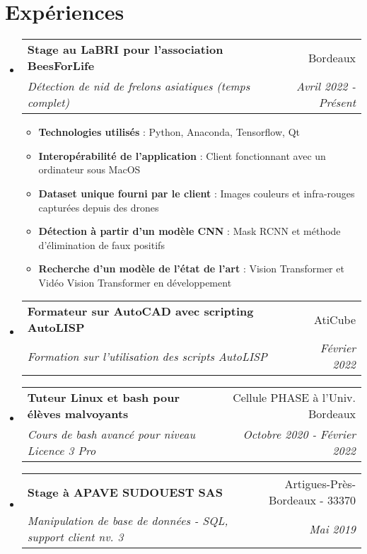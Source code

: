 \documentclass[a4paper]{article}
\makeatletter
\newcommand{\cvitem}[2]{
	\item{
		\textbf{#1}{ : #2 } 
	}
}
\newcommand{\cvsubheading}[4]{
  \vspace{-1pt}\item
    \begin{tabular*}{0.97\textwidth}{l@{\extracolsep{\fill}}r}
      \textbf{#1} & #2 \\
      \textit{#3} & \textit{#4} \\
    \end{tabular*}
}
\makeatother
\begin{document}
\section{Expériences}
	\begin{itemize}[leftmargin=*]
		\cvsubheading{Stage au LaBRI pour l'association BeesForLife}{Bordeaux}
{Détection de nid de frelons asiatiques (temps complet)}{Avril 2022 - Présent}
		\begin{itemize}
			\cvitem{Technologies utilisés}{Python, Anaconda, Tensorflow, Qt}
			\cvitem{Interopérabilité de l'application}{Client fonctionnant avec un ordinateur sous MacOS}
			\cvitem{Dataset unique fourni par le client}{Images couleurs et infra-rouges capturées depuis des drones}
			\cvitem{Détection à partir d'un modèle CNN}{Mask RCNN et méthode d'élimination de faux positifs}
			\cvitem{Recherche d'un modèle de l'état de l'art}{Vision Transformer et Vidéo Vision Transformer en développement}
		\end{itemize}
		\cvsubheading{Formateur sur AutoCAD avec scripting AutoLISP}{AtiCube}{Formation sur l'utilisation des scripts AutoLISP}{Février 2022}
		\cvsubheading{Tuteur Linux et bash pour élèves malvoyants}
{Cellule PHASE à l'Univ. Bordeaux}{Cours de bash avancé pour niveau Licence 3 Pro}{Octobre 2020 - Février 2022}
		\cvsubheading{Stage à APAVE SUDOUEST SAS}
{Artigues-Près-Bordeaux - 33370}{Manipulation de base de données - SQL, support client nv. 3}{Mai 2019}
	\end{itemize}
\end{document}
